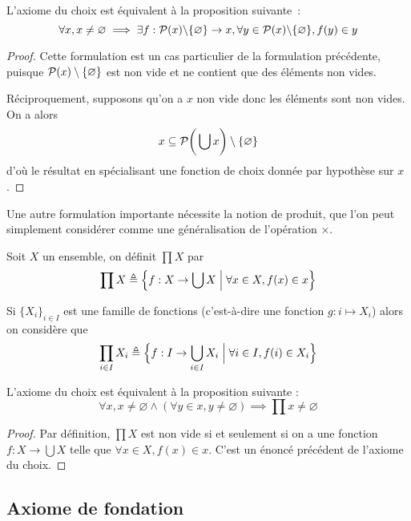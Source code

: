 \begin{proposition}
  L'axiome du choix est équivalent à la proposition suivante~:
  \[\forall x, x\neq\varnothing\implies
  \exists f : \mathcal{P} (x) \backslash \{\varnothing\} \to x,
  \forall y \in \mathcal{P}(x)\backslash \{\varnothing\}, f(y)\in y\]
\end{proposition}

\begin{proof}
  Cette formulation est un cas particulier de la formulation précédente, puisque
  $\mathcal{P}(x)\setminus\{\varnothing\}$ est non vide et ne contient que des
  éléments non vides.

  Réciproquement, supposons qu'on a $x$ non vide donc les éléments sont non
  vides. On a alors
  \[x\subseteq \mathcal{P}\bigg(\bigcup x\bigg)\setminus\{\varnothing\}\]
  d'où le résultat en spécialisant une fonction de choix donnée par hypothèse
  sur $x$.
\end{proof}

Une autre formulation importante nécessite la notion de produit, que l'on peut
simplement considérer comme une généralisation de l'opération $\times$.

\begin{definition}
  Soit $X$ un ensemble, on définit $\prod X$ par
  \[\prod X \triangleq \Big\{f : X \to \bigcup X \;\Big|\; \forall x \in X, f(x)\in
  x\Big\}\]

  Si $\{X_i\}_{i\in I}$ est une famille de fonctions (c'est-à-dire une fonction
  $g : i \mapsto X_i$) alors on considère que
  \[\prod_{i\in I} X_i \triangleq \Big\{ f : I \to \bigcup_{i\in I} X_i\;\Big|\;
  \forall i \in I, f(i) \in X_i\Big\}\]
\end{definition}

\begin{proposition}
  L'axiome du choix est équivalent à la proposition suivante :
  \[\forall x, x\neq \varnothing \land (\forall y \in x, y \neq \varnothing)
  \implies \prod x \neq \varnothing\]
\end{proposition}

\begin{proof}
  Par définition, $\prod X$ est non vide si et seulement si on a une fonction
  $f : X \to \bigcup X$ telle que $\forall x \in X, f(x)\in x$. C'est un énoncé
  précédent de l'axiome du choix.
\end{proof}

\subsection{Axiome de fondation}

